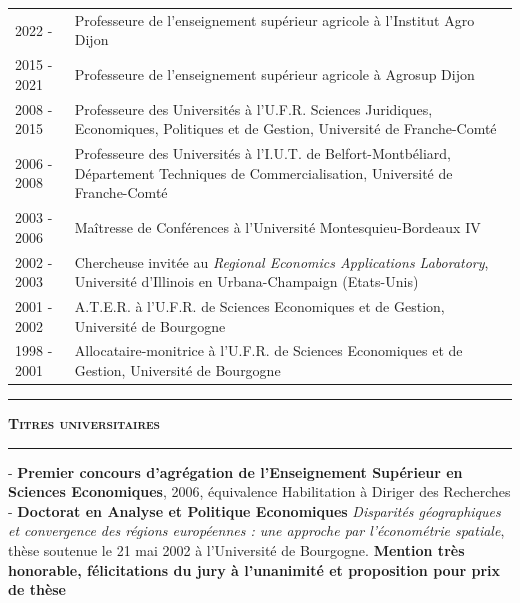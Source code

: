 \documentclass[a4paper,12pt]{article}
\newcommand{\titre}[1]{%
	\bigskip
	\noindent \rule[2mm]{\textwidth}{0.5pt}
	\textbf{\textsc{\large #1}} \\
	\noindent \rule[1mm]{\textwidth}{0.5pt}
	}
\begin{document}
\newlength{\texte}
\setlength{\texte}{\textwidth} \addtolength{\texte}{-\annee} 
	\addtolength{\texte}{-1\tabcolsep}

\noindent \begin{longtable}{@{}p{\annee}p{\texte}@{}}
2022 - 	& Professeure de l'enseignement supérieur agricole à l'Institut Agro Dijon \\
2015 - 2021	& Professeure de l'enseignement supérieur agricole à Agrosup Dijon \\
2008 - 2015	& Professeure des Universités à l'U.F.R. Sciences Juridiques, Economiques, Politiques et de Gestion, Université de Franche-Comté \\
2006 - 2008	& Professeure des Universités à l'I.U.T. de Belfort-Montbéliard, Département Techniques de Commercialisation, Université de Franche-Comté \\
2003 - 2006	& Maîtresse de Conférences à l'Université Montesquieu-Bordeaux IV \\
2002 - 2003	& Chercheuse invitée au \textit{Regional Economics Applications Laboratory}, Université d'Illinois en Urbana-Champaign (Etats-Unis) \\
2001 - 2002	& A.T.E.R. à l'U.F.R. de Sciences Economiques et de Gestion, Université de Bourgogne \\
1998 - 2001	& Allocataire-monitrice à l'U.F.R. de Sciences Economiques et de Gestion, Université de Bourgogne
\end{longtable}


\titre{Titres universitaires}

\noindent - \textbf{Premier concours d'agrégation de l'Enseignement Supérieur en Sciences Economiques}, 2006, équivalence Habilitation à Diriger des Recherches \\
- \textbf{Doctorat en Analyse et Politique Economiques} \newline {} \og{}\textit{Disparités géographiques et convergence des régions européennes : une approche par l'économétrie spatiale}\fg{}, thèse soutenue le 21 mai 2002 à l'Université de Bourgogne. \textbf{Mention très honorable, félicitations du jury à l'unanimité et proposition pour prix de thèse} \\ 
\end{document}

